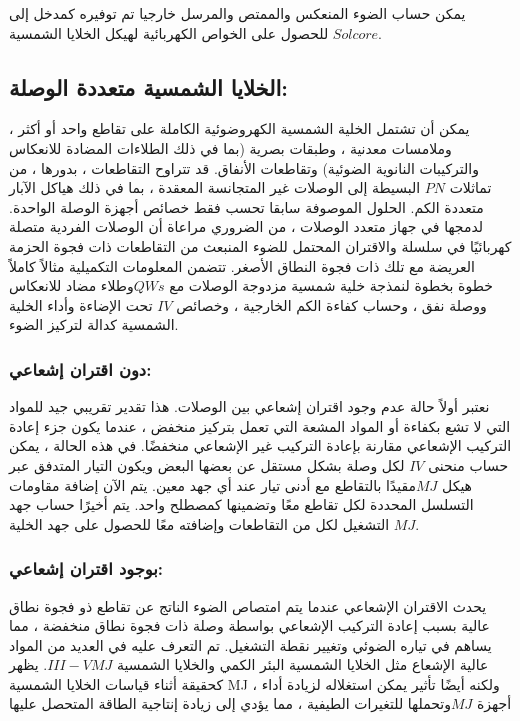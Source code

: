يمكن حساب الضوء المنعكس والممتص والمرسل خارجيا تم توفيره كمدخل إلى $ Solcore $  للحصول على الخواص الكهربائية لهيكل الخلايا الشمسية.

\subsection{الخلايا الشمسية متعددة الوصلة:}
يمكن أن تشتمل الخلية الشمسية الكهروضوئية الكاملة على تقاطع واحد أو أكثر ، وملامسات معدنية ، وطبقات بصرية (بما في ذلك الطلاءات المضادة للانعكاس والتركيبات النانوية الضوئية) وتقاطعات الأنفاق. قد تتراوح التقاطعات ، بدورها ، من تماثلات $ PN $ البسيطة إلى الوصلات غير المتجانسة المعقدة ، بما في ذلك هياكل الآبار متعددة الكم. الحلول الموصوفة سابقا تحسب فقط خصائص أجهزة الوصلة الواحدة. لدمجها في جهاز متعدد الوصلات ، من الضروري مراعاة أن الوصلات الفردية متصلة كهربائيًا في سلسلة والاقتران المحتمل للضوء المنبعث من التقاطعات ذات فجوة الحزمة العريضة مع تلك ذات فجوة النطاق الأصغر. تتضمن المعلومات التكميلية مثالاً كاملاً خطوة بخطوة لنمذجة خلية شمسية مزدوجة الوصلات مع $ QWs  $وطلاء مضاد للانعكاس ووصلة نفق ، وحساب كفاءة الكم الخارجية ، وخصائص $ IV $ تحت الإضاءة وأداء الخلية الشمسية كدالة لتركيز الضوء.
\subsubsection{دون اقتران إشعاعي:}
نعتبر أولاً حالة عدم وجود اقتران إشعاعي بين الوصلات. هذا تقدير تقريبي جيد للمواد التي لا تشع بكفاءة أو المواد المشعة التي تعمل بتركيز منخفض ، عندما يكون جزء إعادة التركيب الإشعاعي مقارنة بإعادة التركيب غير الإشعاعي منخفضًا. في هذه الحالة ، يمكن حساب منحنى $ I V $ لكل وصلة بشكل مستقل عن بعضها البعض ويكون التيار المتدفق عبر هيكل $ MJ  $مقيدًا بالتقاطع مع أدنى تيار عند أي جهد معين. يتم الآن إضافة مقاومات التسلسل المحددة لكل تقاطع معًا وتضمينها كمصطلح واحد. يتم أخيرًا حساب جهد التشغيل لكل من التقاطعات وإضافته معًا للحصول على جهد الخلية $ MJ $.
\subsubsection{بوجود اقتران إشعاعي:}
يحدث الاقتران الإشعاعي عندما يتم امتصاص الضوء الناتج عن تقاطع ذو فجوة نطاق عالية بسبب إعادة التركيب الإشعاعي بواسطة وصلة ذات فجوة نطاق منخفضة ، مما يساهم في تياره الضوئي وتغيير نقطة التشغيل. تم التعرف عليه في العديد من المواد عالية الإشعاع مثل الخلايا الشمسية البئر الكمي والخلايا الشمسية $ III-V MJ $. يظهر كحقيقة أثناء قياسات $  $الخلايا الشمسية MJ ، ولكنه أيضًا تأثير يمكن استغلاله لزيادة أداء أجهزة $ MJ  $وتحملها للتغيرات الطيفية ، مما يؤدي إلى زيادة إنتاجية الطاقة المتحصل عليها
